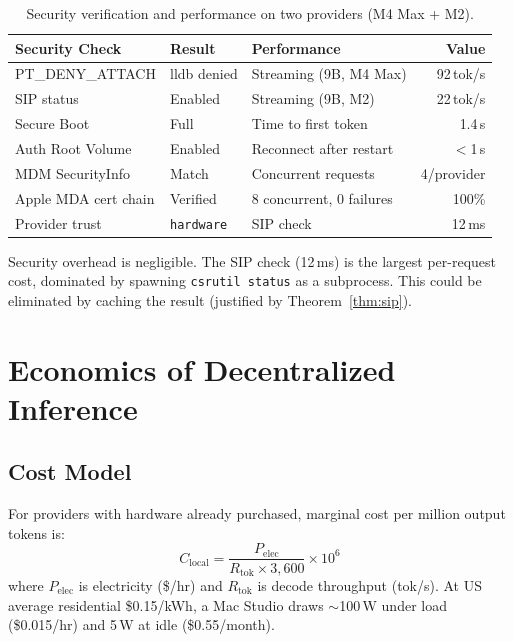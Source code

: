 \documentclass[10pt,twocolumn,letterpaper]{article}
\begin{document}
\begin{table}[h]
\centering
\caption{Security verification and performance on two providers (M4 Max + M2).}
\vspace{4pt}
\small
\begin{tabular}{@{}ll|lr@{}}
\toprule
\textbf{Security Check} & \textbf{Result} & \textbf{Performance} & \textbf{Value} \\
\midrule
PT\_DENY\_ATTACH & lldb denied & Streaming (9B, M4 Max) & 92\,tok/s \\
SIP status & Enabled & Streaming (9B, M2) & 22\,tok/s \\
Secure Boot & Full & Time to first token & 1.4\,s \\
Auth Root Volume & Enabled & Reconnect after restart & $<$1\,s \\
MDM SecurityInfo & Match & Concurrent requests & 4/provider \\
Apple MDA cert chain & Verified & 8 concurrent, 0 failures & 100\% \\
Provider trust & \texttt{hardware} & SIP check & 12\,ms \\
\bottomrule
\end{tabular}
\end{table}

Security overhead is negligible. The SIP check (12\,ms) is the largest per-request cost, dominated by spawning \texttt{csrutil status} as a subprocess. This could be eliminated by caching the result (justified by Theorem~\ref{thm:sip}).

\section{Economics of Decentralized Inference}

\subsection{Cost Model}

For providers with hardware already purchased, marginal cost per million output tokens is:
\begin{equation}
    C_{\text{local}} = \frac{P_{\text{elec}}}{R_{\text{tok}} \times 3{,}600} \times 10^6
\end{equation}
where $P_{\text{elec}}$ is electricity (\$/hr) and $R_{\text{tok}}$ is decode throughput (tok/s). At US average residential \$0.15/kWh, a Mac Studio draws $\sim$100\,W under load (\$0.015/hr) and 5\,W at idle (\$0.55/month).
\end{document}
